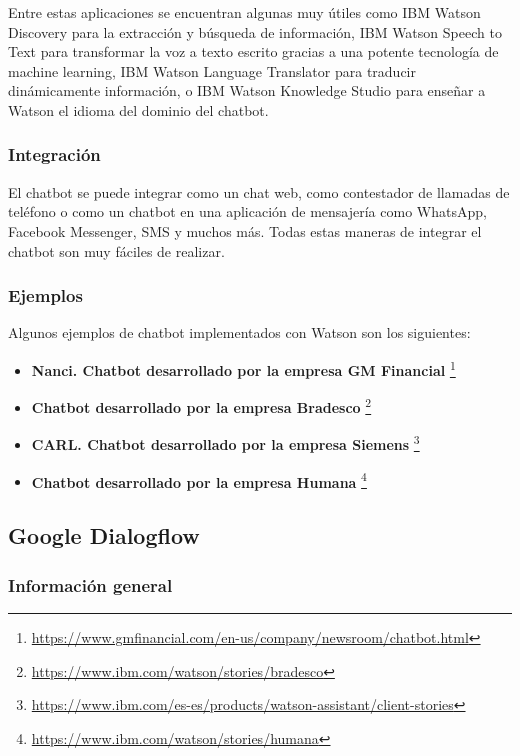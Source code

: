 Entre estas aplicaciones se encuentran algunas muy útiles como IBM Watson Discovery para la extracción y búsqueda de información, IBM Watson Speech to Text para transformar la voz a texto escrito gracias a una potente tecnología de machine learning, IBM Watson Language Translator para traducir dinámicamente información, o IBM Watson Knowledge Studio para enseñar a Watson el idioma del dominio del chatbot.

\subsubsection*{Integración}

El chatbot se puede integrar como un chat web, como contestador de llamadas de teléfono o como un chatbot en una aplicación de mensajería como WhatsApp, Facebook Messenger, SMS y muchos más. Todas estas maneras de integrar el chatbot son muy fáciles de realizar.

\subsubsection*{Ejemplos}

Algunos ejemplos de chatbot implementados con Watson son los siguientes:

\begin{itemize}
\item \textbf{Nanci. Chatbot desarrollado por la empresa GM Financial} \footnote{\url{https://www.gmfinancial.com/en-us/company/newsroom/chatbot.html}}
\item \textbf{Chatbot desarrollado por la empresa Bradesco} \footnote{\url{https://www.ibm.com/watson/stories/bradesco}}
\item \textbf{CARL. Chatbot desarrollado por la empresa Siemens} \footnote{\url{https://www.ibm.com/es-es/products/watson-assistant/client-stories}}
\item \textbf{Chatbot desarrollado por la empresa Humana} \footnote{\url{https://www.ibm.com/watson/stories/humana}}
\end{itemize}


\subsection{Google Dialogflow}\label{subsec:dialogflow}

\subsubsection*{Información general}

